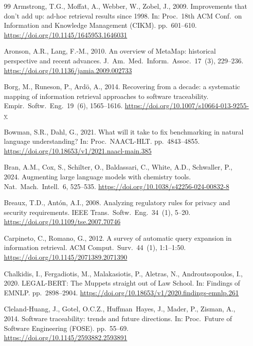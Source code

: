 \documentclass[smallextended,natbib]{svjour3}
\begin{document}
\begin{thebibliography}{99}
Armstrong, T.G., Moffat, A., Webber, W., Zobel, J., 2009. Improvements that don't add up: ad-hoc retrieval results since 1998. In: Proc.\ 18th ACM Conf.\ on Information and Knowledge Management (CIKM). pp.\ 601--610. \url{https://doi.org/10.1145/1645953.1646031}

Aronson, A.R., Lang, F.-M., 2010. An overview of MetaMap: historical perspective and recent advances. J.\ Am.\ Med.\ Inform.\ Assoc.\ 17~(3), 229--236. \url{https://doi.org/10.1136/jamia.2009.002733}

Borg, M., Runeson, P., Ard\"o, A., 2014. Recovering from a decade: a systematic mapping of information retrieval approaches to software traceability. Empir.\ Softw.\ Eng.\ 19~(6), 1565--1616. \url{https://doi.org/10.1007/s10664-013-9255-y}

Bowman, S.R., Dahl, G., 2021. What will it take to fix benchmarking in natural language understanding? In: Proc.\ NAACL-HLT. pp.\ 4843--4855. \url{https://doi.org/10.18653/v1/2021.naacl-main.385}

Bran, A.M., Cox, S., Schilter, O., Baldassari, C., White, A.D., Schwaller, P., 2024. Augmenting large language models with chemistry tools. Nat.\ Mach.\ Intell.\ 6, 525--535. \url{https://doi.org/10.1038/s42256-024-00832-8}

Breaux, T.D., Ant\'on, A.I., 2008. Analyzing regulatory rules for privacy and security requirements. IEEE Trans.\ Softw.\ Eng.\ 34~(1), 5--20. \url{https://doi.org/10.1109/tse.2007.70746}

Carpineto, C., Romano, G., 2012. A survey of automatic query expansion in information retrieval. ACM Comput.\ Surv.\ 44~(1), 1:1--1:50. \url{https://doi.org/10.1145/2071389.2071390}

Chalkidis, I., Fergadiotis, M., Malakasiotis, P., Aletras, N., Androutsopoulos, I., 2020. LEGAL-BERT: The Muppets straight out of Law School. In: Findings of EMNLP. pp.\ 2898--2904. \url{https://doi.org/10.18653/v1/2020.findings-emnlp.261}

Cleland-Huang, J., Gotel, O.C.Z., Huffman~Hayes, J., Mader, P., Zisman, A., 2014. Software traceability: trends and future directions. In: Proc.\ Future of Software Engineering (FOSE). pp.\ 55--69. \url{https://doi.org/10.1145/2593882.2593891}


\end{thebibliography}
\end{document}
